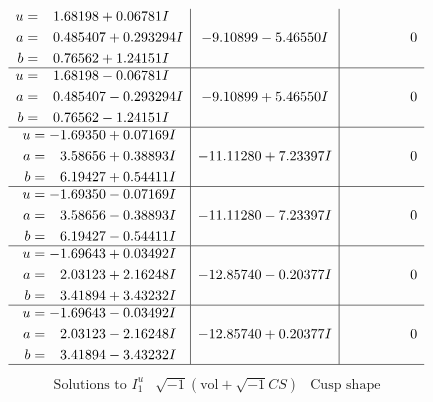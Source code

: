 \documentclass[1p]{elsarticle_modified}
\theoremstyle{definition}
\newcommand{\I}{\sqrt{-1}}
\begin{document}
$$\begin{array}{c|c|c}
\begin{aligned}
u &= \phantom{-}1.68198 + 0.06781 I \\
a &= \phantom{-}0.485407 + 0.293294 I \\
b &= \phantom{-}0.76562 + 1.24151 I\end{aligned}
 & -9.10899 - 5.46550 I & \phantom{-0.000000 } 0 \\ \hline\begin{aligned}
u &= \phantom{-}1.68198 - 0.06781 I \\
a &= \phantom{-}0.485407 - 0.293294 I \\
b &= \phantom{-}0.76562 - 1.24151 I\end{aligned}
 & -9.10899 + 5.46550 I & \phantom{-0.000000 } 0 \\ \hline\begin{aligned}
u &= -1.69350 + 0.07169 I \\
a &= \phantom{-}3.58656 + 0.38893 I \\
b &= \phantom{-}6.19427 + 0.54411 I\end{aligned}
 & -11.11280 + 7.23397 I & \phantom{-0.000000 } 0 \\ \hline\begin{aligned}
u &= -1.69350 - 0.07169 I \\
a &= \phantom{-}3.58656 - 0.38893 I \\
b &= \phantom{-}6.19427 - 0.54411 I\end{aligned}
 & -11.11280 - 7.23397 I & \phantom{-0.000000 } 0 \\ \hline\begin{aligned}
u &= -1.69643 + 0.03492 I \\
a &= \phantom{-}2.03123 + 2.16248 I \\
b &= \phantom{-}3.41894 + 3.43232 I\end{aligned}
 & -12.85740 - 0.20377 I & \phantom{-0.000000 } 0 \\ \hline\begin{aligned}
u &= -1.69643 - 0.03492 I \\
a &= \phantom{-}2.03123 - 2.16248 I \\
b &= \phantom{-}3.41894 - 3.43232 I\end{aligned}
 & -12.85740 + 0.20377 I & \phantom{-0.000000 } 0\\
 \hline 
 \end{array}$$\newpage$$\begin{array}{c|c|c}  
\text{Solutions to }I^u_{1}& \I (\text{vol} + \sqrt{-1}CS) & \text{Cusp shape}\\
 \hline 
\begin{aligned}

\end{aligned}
\end{array}$$
\end{document}
